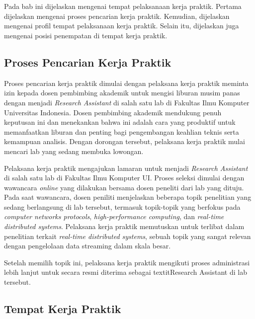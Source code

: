 \chapter{\babSatu}
\label{bab:1}

Pada bab ini dijelaskan mengenai tempat pelaksanaan kerja praktik. Pertama dijelaskan mengenai proses pencarian kerja praktik. Kemudian, dijelaskan mengenai profil tempat pelaksanaan kerja praktik. Selain itu, dijelaskan juga mengenai posisi penempatan di tempat kerja praktik.

\section{Proses Pencarian Kerja Praktik}
\label{sec:pencarian-kerja-praktik}

Proses pencarian kerja praktik dimulai dengan pelaksana kerja praktik meminta izin kepada dosen pembimbing akademik untuk mengisi liburan musim panas dengan menjadi \textit{Research Assistant} di salah satu lab di Fakultas Ilmu Komputer Universitas Indonesia. Dosen pembimbing akademik mendukung penuh keputusan ini dan menekankan bahwa ini adalah cara yang produktif untuk memanfaatkan liburan dan penting bagi pengembangan keahlian teknis serta kemampuan analisis. Dengan dorongan tersebut, pelaksana kerja praktik mulai mencari lab yang sedang membuka lowongan.

Pelaksana kerja praktik mengajukan lamaran untuk menjadi \textit{Research Assistant} di salah satu lab di Fakultas Ilmu Komputer UI. Proses seleksi dimulai dengan wawancara \textit{online} yang dilakukan bersama dosen peneliti dari lab yang dituju. Pada saat wawancara, dosen peniliti menjelaskan beberapa topik penelitian yang sedang berlangsung di lab tersebut, termasuk topik-topik yang berfokus pada \textit{computer networks protocols}, \textit{high-performance computing}, dan \textit{real-time distributed systems}. Pelaksana kerja praktik memutuskan untuk terlibat dalam penelitian terkait \textit{real-time distributed systems}, sebuah topik yang sangat relevan dengan pengelolaan data streaming dalam skala besar.

Setelah memilih topik ini, pelaksana kerja praktik mengikuti proses administrasi lebih lanjut untuk secara resmi diterima sebagai textit{Research Assistant} di lab tersebut.

\section{Tempat Kerja Praktik}
\label{sec:tempat-kerja-praktik}

